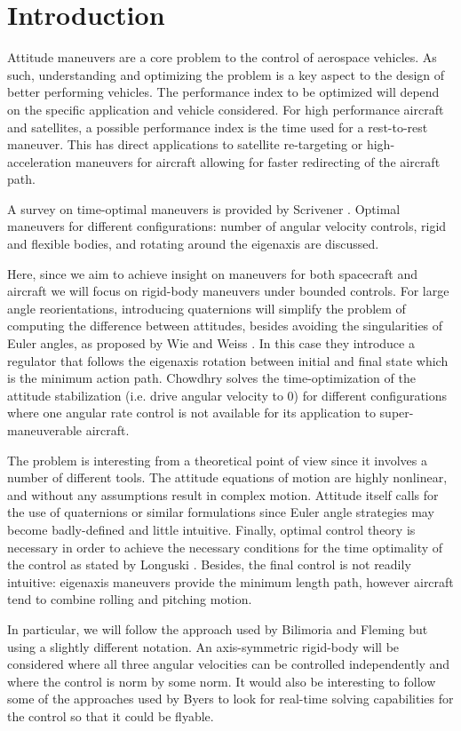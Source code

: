 \section{Introduction}
Attitude maneuvers are a core problem to the control of aerospace vehicles. As such, understanding and optimizing the problem is a key aspect to the design of better performing vehicles. The performance index to be optimized will depend on the specific application and vehicle considered. For high performance aircraft and satellites, a possible performance index is the time used for a rest-to-rest maneuver. This has direct applications to satellite re-targeting or high-acceleration maneuvers for aircraft allowing for faster redirecting of the aircraft path. 

A survey on time-optimal maneuvers is provided by Scrivener \cite{scrivener1994survey}. Optimal maneuvers for different configurations: number of angular velocity controls, rigid and flexible bodies, and rotating around the eigenaxis are discussed.

Here, since we aim to achieve insight on maneuvers for both spacecraft and aircraft we will focus on rigid-body maneuvers under bounded controls. For large angle reorientations, introducing quaternions will simplify the problem of computing the difference between attitudes, besides avoiding the singularities of Euler angles, as proposed by Wie and Weiss \cite{wie1989quaternion}. In this case they introduce a regulator that follows the eigenaxis rotation between initial and final state which is the minimum action path. Chowdhry \cite{chowdhry1991optimal} solves the time-optimization of the attitude stabilization (i.e. drive angular velocity to 0) for different configurations where one angular rate control is not available for its application to super-maneuverable aircraft.

The problem is interesting from a theoretical point of view since it involves a number of different tools. The attitude equations of motion are highly nonlinear, and without any assumptions result in complex motion. Attitude itself calls for the use of quaternions or similar formulations since Euler angle strategies may become badly-defined and little intuitive. Finally, optimal control theory is necessary in order to achieve the necessary conditions for the time optimality of the control as stated by Longuski \cite{longuski2014optimal}. Besides, the final control is not readily intuitive: eigenaxis maneuvers provide the minimum length path, however aircraft tend to combine rolling and pitching motion.

In particular, we will follow the approach used by Bilimoria \cite{bilimoria1993time} and Fleming \cite{fleming2010minimum} but using a slightly different notation. An axis-symmetric rigid-body will be considered where all three angular velocities can be controlled independently and where the control is norm by some norm. It would also be interesting to follow some of the approaches used by Byers \cite{byers1993quasi} to look for real-time solving capabilities for the control so that it could be flyable.


